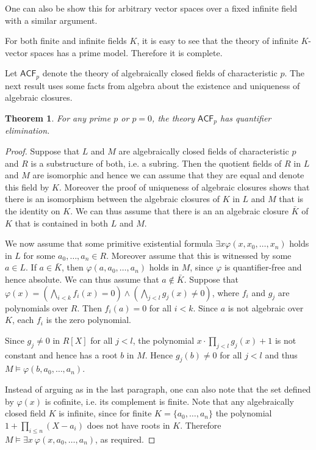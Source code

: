 \documentclass[a4paper, 11pt]{amsart}
\newtheorem{theorem}{Theorem}[subsection]
\theoremstyle{remark}
\newtheorem{problem}[]{Problem}
\begin{document}
One can also be show this for arbitrary vector spaces over a fixed infinite field with a similar argument. 


For both finite and infinite fields $K$, it is easy to see that the theory of infinite $K$-vector spaces has a prime model. Therefore it is complete. 

Let $\mathsf{ACF}_p$ denote the theory of algebraically closed fields of characteristic $p$. 
The next result uses some facts from algebra about the existence and uniqueness of algebraic closures. 

\begin{theorem} 
For any prime $p$ or $p=0$, the theory $\mathsf{ACF}_p$ has quantifier elimination.  
\end{theorem} 
\begin{proof} 
Suppose that $L$ and $M$ are algebraically closed fields of characteristic $p$ and $R$ is a substructure of both, i.e. a subring. Then the quotient fields of $R$ in $L$ and $M$ are isomorphic and hence we can assume that they are equal and denote this field by $K$. Moreover the proof of uniqueness of algebraic closures shows that there is an isomorphism between the algebraic closures of $K$ in $L$ and $M$ that is the identity on $K$. We can thus assume that there is an an algebraic closure $\bar{K}$ of $K$ that is contained in both $L$ and $M$. 

We now assume that some primitive existential formula $\exists x \varphi(x,x_0,\dots,x_n)$ holds in $L$ for some $a_0,\dots,a_n\in R$.
Moreover assume that this is witnessed by some $a\in L$. If $a\in \bar{K}$, then $\varphi(a,a_0,\dots,a_n)$ holds in $M$, since $\varphi$ is quantifier-free and hence absolute. We can thus assume that $a\notin \bar{K}$. 
Suppose that $\varphi(x)=(\bigwedge_{i<k}f_i(x)=0)\wedge(\bigwedge_{j<l}g_j(x)\neq 0)$, where $f_i$ and $g_j$ are polynomials over $R$. Then $f_i(a)=0$ for all $i<k$. Since $a$ is not algebraic over $K$, each $f_i$ is the zero polynomial. 

Since $g_j\neq 0$ in $R[X]$ for all $j<l$, the polynomial $x\cdot \prod_{j<l} g_j(x)+1$ is not constant and hence has a root $b$ in $M$. Hence $g_j(b)\neq 0$ for all $j<l$ and thus $M\models \varphi(b,a_0,\dots,a_n)$. 

Instead of arguing as in the last paragraph, one can also note that the set defined by $\varphi(x)$ is cofinite, i.e. its complement is finite. 
Note that any algebraically closed field $K$ is infinite, since for finite $K=\{a_0,\dots,a_n\}$ the polynomial $1+\prod_{i\leq n} (X-a_i)$ does not have roots in $K$. 
Therefore $M\models \exists x\ \varphi(x,a_0,\dots,a_n)$, as required. 
\end{proof} 
\end{document}

